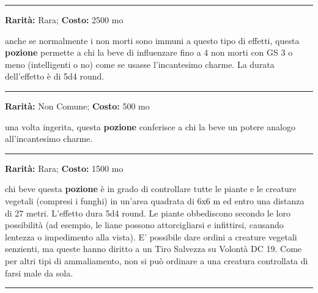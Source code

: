 \begin{multicols}{2}
\smallskip\noindent\rule{\linewidth}{2pt}  \hypertarget{PozionediControllodeinonmorti}{}\medskip{}\noindent\label{PozionediControllodeinonmorti}

\textbf{Rarità:} Rara; \textbf{Costo:} 2500 mo

anche se normalmente i non morti sono immuni a questo tipo di effetti, questa \textbf{pozione} permette a chi la beve di influenzare fino a 4 non morti con GS 3 o meno (intelligenti o no) come se usasse l'incantesimo charme. La durata dell'effetto è di 5d4 round.

\smallskip\noindent\rule{\linewidth}{2pt}  \hypertarget{PozionediControllodellepersone}{}\medskip{}\noindent\label{PozionediControllodellepersone}

\textbf{Rarità:} Non Comune; \textbf{Costo:} 500 mo

una volta ingerita, questa \textbf{pozione} conferisce a chi la beve un potere analogo all'incantesimo charme.

\smallskip\noindent\rule{\linewidth}{2pt}  \hypertarget{PozionediControllodellepiante}{}\medskip{}\noindent\label{PozionediControllodellepiante}

\textbf{Rarità:} Rara; \textbf{Costo:} 1500 mo

chi beve questa \textbf{pozione} è in grado di controllare tutte le piante e le creature vegetali (compresi i funghi) in un'area quadrata di 6x6 m ed entro una distanza di 27 metri. L'effetto dura 5d4 round. Le piante obbediscono secondo le loro possibilità (ad esempio, le liane possono attorcigliarsi e infittirsi, causando lentezza o impedimento alla vista). E' possibile dare ordini a creature vegetali senzienti, ma queste hanno diritto a un Tiro Salvezza su Volontà DC 19. Come per altri tipi di ammaliamento, non si può ordinare a una creatura controllata di farsi male da sola.

\smallskip\noindent\rule{\linewidth}{2pt}  \hypertarget{PozionediCrescita}{}\medskip{}\noindent\label{PozionediCrescita}


\end{multicols}

